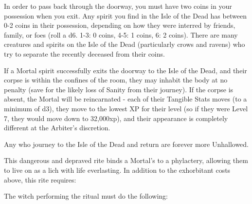 {In order to pass back through the doorway, you must have two coins in your possession when you exit.  Any spirit you find in the Isle of the Dead has between 0-2 coins in their possession, depending on how they were interred by friends, family, or foes (roll a d6.  1-3: 0 coins, 4-5: 1 coins, 6: 2 coins).  There are many creatures and spirits on the Isle of the Dead (particularly crows and ravens) who try to separate the recently deceased from their coins.

If a Mortal spirit successfully exits the doorway to the Isle of the Dead, and their corpse is within the confines of the room, they may inhabit the body at no penalty (save for the likely loss of Sanity from their journey).  If the corpse is absent, the Mortal will be reincarnated - each of their Tangible Stats moves \DCDOWN (to a minimum of d3), they move to the lowest XP for their level (so if they were Level 7, they would move down to 32,000xp), and their appearance is completely different at the Arbiter's discretion.

Any who journey to the Isle of the Dead and return are forever more Unhallowed. 

\newpage

\OCCULT[
  Name=Lichdom,
  Link=occultism-lichdom,
  Success=2 (plus see below),
  Cost=66{,}666\AU
]

This dangerous and depraved rite binds a Mortal's  to a phylactery, allowing them to live on as a lich with life everlasting. In addition to the exhorbitant costs above, this rite requires:



The witch performing the ritual must do the following:

}
